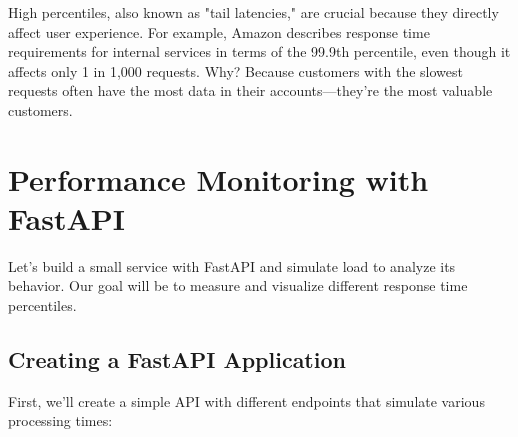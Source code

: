 \documentclass[12pt,letterpaper]{article}
\begin{document}
High percentiles, also known as "tail latencies," are crucial because they directly affect user experience. For example, Amazon describes response time requirements for internal services in terms of the 99.9th percentile, even though it affects only 1 in 1,000 requests. Why? Because customers with the slowest requests often have the most data in their accounts—they're the most valuable customers.

\section{Performance Monitoring with FastAPI}

Let's build a small service with FastAPI and simulate load to analyze its behavior. Our goal will be to measure and visualize different response time percentiles.

\subsection{Creating a FastAPI Application}

First, we'll create a simple API with different endpoints that simulate various processing times:
\end{document}
